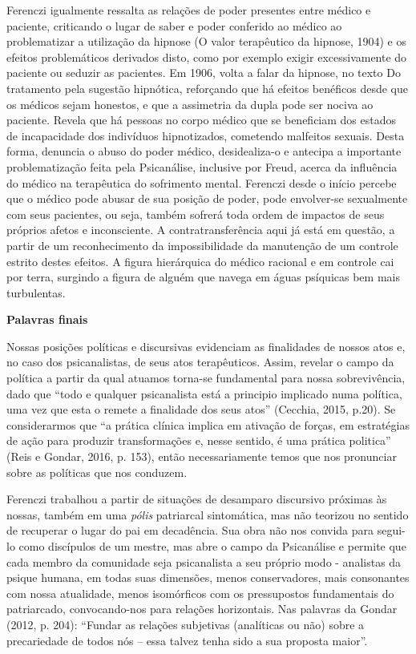 Ferenczi igualmente ressalta as relações de poder presentes entre médico
e paciente, criticando o lugar de saber e poder conferido ao médico ao
problematizar a utilização da hipnose (O valor terapêutico da hipnose,
1904) e os efeitos problemáticos derivados disto, como por exemplo
exigir excessivamente do paciente ou seduzir as pacientes. Em 1906,
volta a falar da hipnose, no texto Do tratamento pela sugestão
hipnótica, reforçando que há efeitos benéficos desde que os médicos
sejam honestos, e que a assimetria da dupla pode ser nociva ao paciente.
Revela que há pessoas no corpo médico que se beneficiam dos estados de
incapacidade dos indivíduos hipnotizados, cometendo malfeitos sexuais.
Desta forma, denuncia o abuso do poder médico, desidealiza-o e antecipa
a importante problematização feita pela Psicanálise, inclusive por
Freud, acerca da influência do médico na terapêutica do sofrimento
mental. Ferenczi desde o início percebe que o médico pode abusar de sua
posição de poder, pode envolver-se sexualmente com seus pacientes, ou
seja, também sofrerá toda ordem de impactos de seus próprios afetos e
inconsciente. A contratransferência aqui já está em questão, a partir de
um reconhecimento da impossibilidade da manutenção de um controle
estrito destes efeitos. A figura hierárquica do médico racional e em
controle cai por terra, surgindo a figura de alguém que navega em águas
psíquicas bem mais turbulentas.

\textbf{Palavras finais}

Nossas posições políticas e discursivas evidenciam as finalidades de
nossos atos e, no caso dos psicanalistas, de seus atos terapêuticos.
Assim, revelar o campo da política a partir da qual atuamos torna-se
fundamental para nossa sobrevivência, dado que ``todo e qualquer
psicanalista está a principio implicado numa política, uma vez que esta
o remete a finalidade dos seus atos'' (Cecchia, 2015, p.20). Se
considerarmos que ``a prática clínica implica em ativação de forças, em
estratégias de ação para produzir transformações e, nesse sentido, é uma
prática politica'' (Reis e Gondar, 2016, p. 153), então necessariamente
temos que nos pronunciar sobre as políticas que nos conduzem.

Ferenczi trabalhou a partir de situações de desamparo discursivo
próximas às nossas, também em uma \emph{pólis} patriarcal sintomática,
mas não teorizou no sentido de recuperar o lugar do pai em decadência.
Sua obra não nos convida para segui-lo como discípulos de um mestre, mas
abre o campo da Psicanálise e permite que cada membro da comunidade seja
psicanalista a seu próprio modo - analistas da psique humana, em todas
suas dimensões, menos conservadores, mais consonantes com nossa
atualidade, menos isomórficos com os pressupostos fundamentais do
patriarcado, convocando-nos para relações horizontais. Nas palavras da
Gondar (2012, p. 204): ``Fundar as relações subjetivas (analíticas ou
não) sobre a precariedade de todos nós -- essa talvez tenha sido a sua
proposta maior''.


